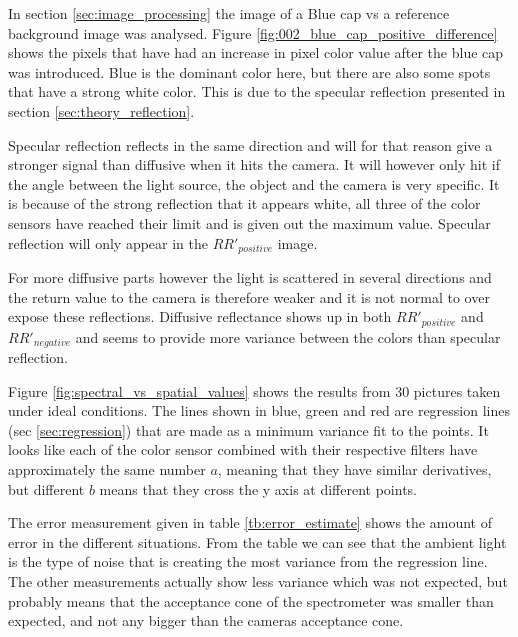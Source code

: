 In section \ref{sec:image_processing} the image of a Blue cap vs a reference background image was analysed. 
Figure \ref{fig:002_blue_cap_positive_difference} shows the pixels that have had an increase in pixel color value after the blue cap was introduced. Blue is the dominant color here, but there are also some spots that have a strong white color. This is due to the specular reflection presented in section \ref{sec:theory_reflection}. 

Specular reflection reflects in the same direction and will for that reason give a stronger signal than diffusive when it hits the camera. It will however only hit if the angle between the light source, the object and the camera is very specific. It is because of the strong reflection that it appears white, all three of the color sensors have reached their limit and is given out the maximum value. Specular reflection will only appear in the $RR'_{positive}$ image. 

For more diffusive parts however the light is scattered in several directions and the return value to the camera is therefore weaker and it is not normal to over expose these reflections. Diffusive reflectance shows up in both $RR'_{positive}$ and $RR'_{negative}$ and seems to provide more variance between the colors than specular reflection. 

Figure \ref{fig:spectral_vs_spatial_values} shows the results from 30 pictures taken under ideal conditions. The lines shown in blue, green and red are regression lines (sec \ref{sec:regression}) that are made as a minimum variance fit to the points. It looks like each of the color sensor combined with their respective filters have approximately the same number $a$, meaning that they have similar derivatives, but different $b$ means that they cross the y axis at different points. 

The error measurement given in table \ref{tb:error_estimate} shows the amount of error in the different situations. From the table we can see that the ambient light is the type of noise that is creating the most variance from the regression line. The other measurements actually show less variance which was not expected, but probably means that the acceptance cone of the spectrometer was smaller than expected, and not any bigger than the cameras acceptance cone. 


